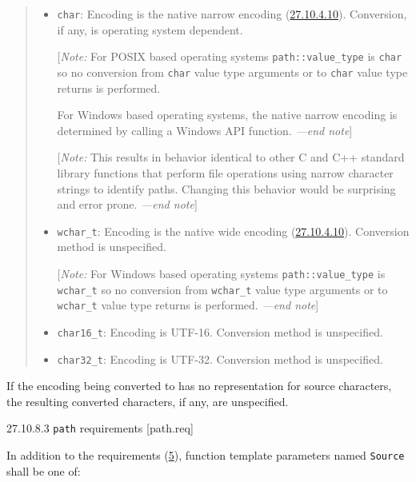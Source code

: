 \begin{quote}
\begin{itemize}
\item
  \texttt{char}: Encoding is the native narrow encoding
  (\hyperref[fs.def.native.encode]{27.10.4.10}). Conversion, if any, is
  operating system dependent.

  {[}\emph{Note:} For POSIX based operating systems
  \texttt{path::value\_type} is \texttt{char} so no conversion from
  \texttt{char} value type arguments or to \texttt{char} value type
  returns is performed.

  For Windows based operating systems, the native narrow encoding is
  determined by calling a Windows API function. \emph{---end note}{]}

  {[}\emph{Note:} This results in behavior identical to other C and C++
  standard library functions that perform file operations using narrow
  character strings to identify paths. Changing this behavior would be
  surprising and error prone. \emph{---end note}{]}
\item
  \texttt{wchar\_t}: Encoding is the native wide encoding
  (\hyperref[fs.def.native.encode]{27.10.4.10}). Conversion method is
  unspecified.

  {[}\emph{Note:} For Windows based operating systems
  \texttt{path::value\_type} is \texttt{wchar\_t} so no conversion from
  \texttt{wchar\_t} value type arguments or to \texttt{wchar\_t} value
  type returns is performed. \emph{---end note}{]}
\item
  \texttt{char16\_t}: Encoding is UTF-16. Conversion method is
  unspecified.
\item
  \texttt{char32\_t}: Encoding is UTF-32. Conversion method is
  unspecified.
\end{itemize}
\end{quote}

If the encoding being converted to has no representation for source
characters, the resulting converted characters, if any, are unspecified.

27.10.8.3 \texttt{path} requirements {[}path.req{]}

In addition to the requirements (\hyperref[fs.req]{5}), function
template parameters named \texttt{Source} shall be one of:

